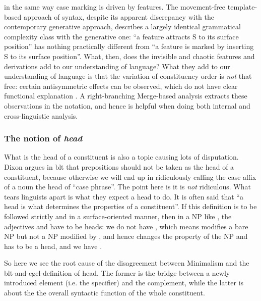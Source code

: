 \documentclass[../main.tex]{subfiles}
\begin{document}
in the same way case marking is driven by features.
The movement-free template-based approach of syntax,
despite its apparent discrepancy with the contemporary generative approach,
describes a largely identical grammatical complexity class with the generative one:
``a feature attracts S to its surface position''
has nothing practically different from ``a feature is marked by inserting S to its surface position''.
What, then, does the invisible and chaotic features and derivations add to our understanding of language?
What they add to our understanding of language 
is that the variation of constituency order is \emph{not} that free:
certain antisymmetric effects can be observed,
which do not have clear functional explanation \citep{cinque2014typological}.
A right-branching Merge-based analysis extracts these observations in the notation,
and hence is helpful when doing both internal and cross-linguistic analysis.

\subsubsection{The notion of \emph{head}}\label{sec:headedness}

What is the head of a constituent is also a topic causing lots of disputation. 
Dixon argues in \ac{blt} that prepositions should not be taken as the head of a constituent,
because otherwise we will end up in ridiculously calling the case affix of a noun the head of ``case phrase''.
The point here is it is \emph{not} ridiculous.
What tears linguists apart is what they expect a head to do. 
It is often said that 
``a head is what determines the properties of a constituent''.
If this definition is to be followed strictly and in a surface-oriented manner,
then in a NP like ,
the adjectives  and  have to be heads:
we do not have ,
which means  modifies a bare NP but not a NP modified by ,
and hence  changes the property of the NP and has to be a head, 
and we have .

So here we see the root cause of the disagreement between Minimalism and the \ac{blt}-and-\ac{cgel}-definition 
of head. 
The former is the bridge between a newly introduced element (i.e. the specifier) and the complement, 
while the latter is about the the overall syntactic function of the whole constituent. 
\end{document}
